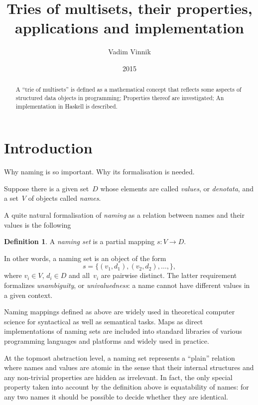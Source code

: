 \documentclass{article}
\title{Tries of multisets, their properties, applications and implementation}
\author{Vadim Vinnik}
\date{2015}
\theoremstyle{definition}
\newtheorem{Df}{Definition}
\begin{document}
\maketitle

\begin{abstract}
A ``trie of multisets'' is defined as a mathematical concept that
reflects some aspects of structured data objects in programming;
Properties thereof are investigated; An implementation in Haskell
is described.
\end{abstract}

\tableofcontents

\section{Introduction}

Why naming is so important. Why its formalisation is needed.

Suppose there is a given set~$D$ whose elements are called \emph{values}, or
\emph{denotata}, and a set~$V$ of objects called \emph{names}.

A quite natural formalisation of \emph{naming} as a relation between names and
their values is the following
\begin{Df}\label{df:naming-set}
A \emph{naming set} is a partial mapping $s: V\to D$.
\end{Df}

In other words, a naming set is an object of the form
\[
  s = \{ (v_1, d_1), (v_2, d_2), \ldots, \} ,
\]
where $v_i\in V$, $d_i\in D$ and all~$v_i$ are pairwise distinct. The
latter requirement formalizes \emph{unambiguity}, or \emph{univaluedness}: a
name cannot have different values in a given context.

Naming mappings defined as above are widely used in theoretical computer
science for syntactical as well as semantical tasks.
Maps as direct
implementations of naming sets are included into standard libraries of various
programming languages and platforms and widely used in practice.

At the topmost abstraction level, a naming set represents a ``plain''
relation where names and values are atomic in the sense that their internal
structures and any non-trivial properties are hidden as irrelevant. In
fact, the only special property taken into account by the definition above is
equatability of names: for any two names it should be possible to decide
whether they are identical.
\end{document}
